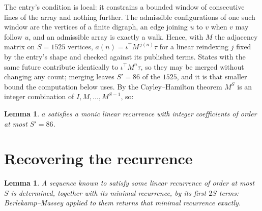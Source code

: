 \documentclass[11pt,a4paper]{article}
\theoremstyle{plain}
\newtheorem{lemma}[theorem]{Lemma}
\theoremstyle{definition}
\begin{document}
The entry's condition is local: it constrains a bounded window of consecutive lines of the
array and nothing further. The admissible configurations of one such window are the vertices
of a finite digraph, an edge joining $u$ to $v$ when $v$ may follow $u$, and an admissible
array is exactly a walk. Hence, with $M$ the adjacency matrix on $S=1525$ vertices,
$a(n)=\iota^{\!\top}M^{\,j(n)}\tau$ for a linear reindexing $j$ fixed by the entry's shape
and checked against its published terms. States with the same future contribute identically to $\iota^{\!\top}M^n\tau$, so they may be merged without changing any count; merging leaves $S'=86$ of the $1525$, and it is that smaller bound the computation below uses. By the Cayley--Hamilton theorem $M^{S}$ is an
integer combination of $I,M,\dots,M^{S-1}$, so:

\begin{lemma}\label{lem:cf}
$a$ satisfies a monic linear recurrence with integer coefficients of order at most
$S'=86$.
\end{lemma}

\section{Recovering the recurrence}

\begin{lemma}\label{lem:bm}
A sequence known to satisfy some linear recurrence of order at most $S$ is determined, together
with its minimal recurrence, by its first $2S$ terms: Berlekamp--Massey applied to them returns
that minimal recurrence exactly.
\end{lemma}
\end{document}
